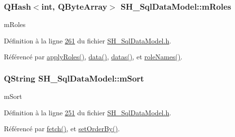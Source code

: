 \hypertarget{classSH__SqlDataModel_ad1e46c72a6aeb83e3e7bb0c3110d12a4}{
\subsubsection[{m\-Roles}]{\setlength{\rightskip}{0pt plus 5cm}Q\-Hash$<$int, Q\-Byte\-Array$>$ S\-H\-\_\-\-Sql\-Data\-Model\-::m\-Roles\hspace{0.3cm}{\ttfamily [private]}}}\label{classSH__SqlDataModel_ad1e46c72a6aeb83e3e7bb0c3110d12a4}


m\-Roles 



Définition à la ligne \hyperlink{SH__SqlDataModel_8h_source_l00261}{261} du fichier \hyperlink{SH__SqlDataModel_8h_source}{S\-H\-\_\-\-Sql\-Data\-Model.\-h}.



Référencé par \hyperlink{classSH__SqlDataModel_ad4f032ceb7c2f70b2d7388e3afd161ab}{apply\-Roles()}, \hyperlink{classSH__SqlDataModel_aa4664329d52c2d2cba2bacc42fa1a564}{data()}, \hyperlink{classSH__SqlDataModel_a24db284b370930b57e2261a7a72e2da8}{datas()}, et \hyperlink{classSH__SqlDataModel_ac9954bbf92ed14566128c74318e3125b}{role\-Names()}.

\hypertarget{classSH__SqlDataModel_a7e36fd116b7cb50e949ee56af0c31772}{
\subsubsection[{m\-Sort}]{\setlength{\rightskip}{0pt plus 5cm}Q\-String S\-H\-\_\-\-Sql\-Data\-Model\-::m\-Sort\hspace{0.3cm}{\ttfamily [private]}}}\label{classSH__SqlDataModel_a7e36fd116b7cb50e949ee56af0c31772}


m\-Sort 



Définition à la ligne \hyperlink{SH__SqlDataModel_8h_source_l00251}{251} du fichier \hyperlink{SH__SqlDataModel_8h_source}{S\-H\-\_\-\-Sql\-Data\-Model.\-h}.



Référencé par \hyperlink{classSH__SqlDataModel_ab6c206088250a66ddc8cb8d33a38e421}{fetch()}, et \hyperlink{classSH__SqlDataModel_ab443cd7935993270c37f9bd977b33875}{set\-Order\-By()}.

